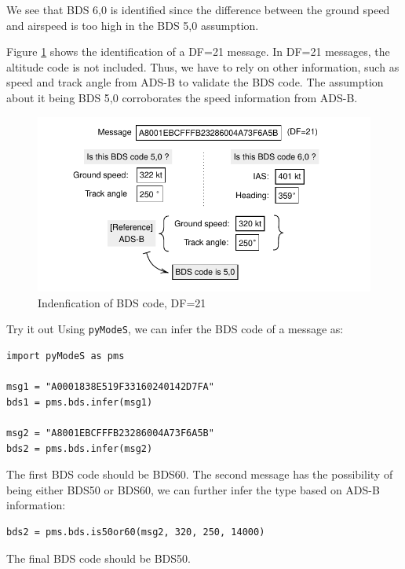 We see that BDS 6,0 is identified since the difference between the ground speed and airspeed is too high in the BDS 5,0 assumption.

Figure \ref{fig:bds_bds_infer_example_2} shows the identification of a DF=21 message. In DF=21 messages, the altitude code is not included. Thus, we have to rely on other information, such as speed and track angle from ADS-B to validate the BDS code. The assumption about it being BDS 5,0 corroborates the speed information from ADS-B.

\begin{figure}[ht]
\centering
\includegraphics[scale=0.85]{figures/mode_s/bds_infer_example_2.pdf}
\caption{Indenfication of BDS code, DF=21}
\label{fig:bds_bds_infer_example_2}
\end{figure}

\begin{notebox}{Try it out}
Using \texttt{pyModeS}, we can infer the BDS code of a message as: 

\begin{verbatim}
import pyModeS as pms

msg1 = "A0001838E519F33160240142D7FA"
bds1 = pms.bds.infer(msg1)

msg2 = "A8001EBCFFFB23286004A73F6A5B"
bds2 = pms.bds.infer(msg2) 
\end{verbatim}

The first BDS code should be BDS60. The second message has the possibility of being either BDS50 or BDS60, we can further infer the type based on ADS-B information:

\begin{verbatim}
bds2 = pms.bds.is50or60(msg2, 320, 250, 14000)
\end{verbatim}

The final BDS code should be BDS50. 

\end{notebox}
